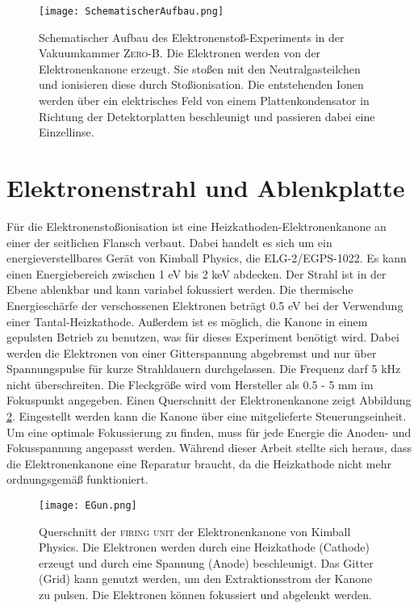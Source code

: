 \begin{landscape}
    \begin{figure}
        \centering
        \vspace*{-1cm}\hspace*{-1cm}\texttt{[image: SchematischerAufbau.png]}
        \caption[Schematischer Aufbau des Experiments]{Schematischer Aufbau des Elektronenstoß-Experiments in der Vakuumkammer \textsc{Zero-B}. Die Elektronen werden von der Elektronenkanone erzeugt. Sie stoßen mit den Neutralgasteilchen und ionisieren diese durch Stoßionisation. Die entstehenden Ionen werden über ein elektrisches Feld von einem Plattenkondensator in Richtung der Detektorplatten beschleunigt und passieren dabei eine Einzellinse.}
        \label{fig:Aufbau}
    \end{figure}
\end{landscape}

\section{Elektronenstrahl und Ablenkplatte}
\label{sec:Elektronenstrahl}
Für die Elektronenstoßionisation ist eine Heizkathoden-Elektronenkanone an einer der seitlichen Flansch verbaut. Dabei handelt es sich um ein energieverstellbares Gerät von Kimball Physics, die ELG-2/EGPS-1022. Es kann einen Energiebereich zwischen 1 eV bis 2 keV abdecken. Der Strahl ist in der Ebene ablenkbar und kann variabel fokussiert werden. Die thermische Energieschärfe der verschossenen Elektronen beträgt 0.5 eV bei der Verwendung einer Tantal-Heizkathode. Außerdem ist es möglich, die Kanone in einem gepulsten Betrieb zu benutzen, was für dieses Experiment benötigt wird. Dabei werden die Elektronen von einer Gitterspannung abgebremst und nur über Spannungspulse für kurze Strahldauern durchgelassen. Die Frequenz darf 5 kHz nicht überschreiten. Die Fleckgröße wird vom Hersteller als 0.5 - 5 mm im Fokuspunkt angegeben. Einen Querschnitt der Elektronenkanone zeigt Abbildung \ref{fig:EGun}. Eingestellt werden kann die Kanone über eine mitgelieferte Steuerungseinheit. Um eine optimale Fokussierung zu finden, muss für jede Energie die Anoden- und Fokusspannung angepasst werden. Während dieser Arbeit stellte sich heraus, dass die Elektronenkanone eine Reparatur braucht, da die Heizkathode nicht mehr ordnungsgemäß funktioniert.

\begin{figure}
    \centering
    \texttt{[image: EGun.png]}
    \caption[Querschnitt der \textsc{firing unit} der Elektronenkanone]{Querschnitt der \textsc{firing unit} der Elektronenkanone von Kimball Physics. Die Elektronen werden durch eine Heizkathode (Cathode) erzeugt und durch eine Spannung (Anode) beschleunigt. Das Gitter (Grid) kann genutzt werden, um den Extraktionsstrom der Kanone zu pulsen. Die Elektronen können fokussiert und abgelenkt werden.}
    \label{fig:EGun}
\end{figure}

